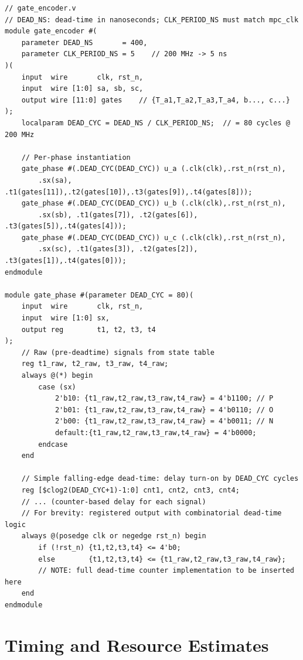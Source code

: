 \documentclass[11pt,a4paper]{article}
\begin{document}
\begin{lstlisting}[style=verilog, caption={Gate encoder with programmable
  dead-time insertion.}, label={lst:gate}]
// gate_encoder.v
// DEAD_NS: dead-time in nanoseconds; CLK_PERIOD_NS must match mpc_clk
module gate_encoder #(
    parameter DEAD_NS       = 400,
    parameter CLK_PERIOD_NS = 5    // 200 MHz -> 5 ns
)(
    input  wire       clk, rst_n,
    input  wire [1:0] sa, sb, sc,
    output wire [11:0] gates    // {T_a1,T_a2,T_a3,T_a4, b..., c...}
);
    localparam DEAD_CYC = DEAD_NS / CLK_PERIOD_NS;  // = 80 cycles @ 200 MHz

    // Per-phase instantiation
    gate_phase #(.DEAD_CYC(DEAD_CYC)) u_a (.clk(clk),.rst_n(rst_n),
        .sx(sa), .t1(gates[11]),.t2(gates[10]),.t3(gates[9]),.t4(gates[8]));
    gate_phase #(.DEAD_CYC(DEAD_CYC)) u_b (.clk(clk),.rst_n(rst_n),
        .sx(sb), .t1(gates[7]), .t2(gates[6]), .t3(gates[5]),.t4(gates[4]));
    gate_phase #(.DEAD_CYC(DEAD_CYC)) u_c (.clk(clk),.rst_n(rst_n),
        .sx(sc), .t1(gates[3]), .t2(gates[2]), .t3(gates[1]),.t4(gates[0]));
endmodule

module gate_phase #(parameter DEAD_CYC = 80)(
    input  wire       clk, rst_n,
    input  wire [1:0] sx,
    output reg        t1, t2, t3, t4
);
    // Raw (pre-deadtime) signals from state table
    reg t1_raw, t2_raw, t3_raw, t4_raw;
    always @(*) begin
        case (sx)
            2'b10: {t1_raw,t2_raw,t3_raw,t4_raw} = 4'b1100; // P
            2'b01: {t1_raw,t2_raw,t3_raw,t4_raw} = 4'b0110; // O
            2'b00: {t1_raw,t2_raw,t3_raw,t4_raw} = 4'b0011; // N
            default:{t1_raw,t2_raw,t3_raw,t4_raw} = 4'b0000;
        endcase
    end

    // Simple falling-edge dead-time: delay turn-on by DEAD_CYC cycles
    reg [$clog2(DEAD_CYC+1)-1:0] cnt1, cnt2, cnt3, cnt4;
    // ... (counter-based delay for each signal)
    // For brevity: registered output with combinatorial dead-time logic
    always @(posedge clk or negedge rst_n) begin
        if (!rst_n) {t1,t2,t3,t4} <= 4'b0;
        else        {t1,t2,t3,t4} <= {t1_raw,t2_raw,t3_raw,t4_raw};
        // NOTE: full dead-time counter implementation to be inserted here
    end
endmodule
\end{lstlisting}

\section{Timing and Resource Estimates}
\label{sec:timing}
\end{document}
